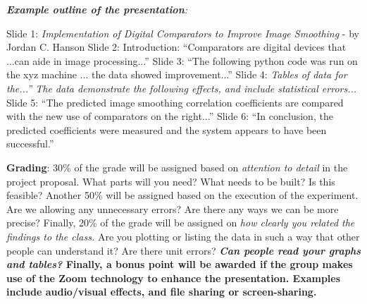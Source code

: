\documentclass[10pt]{article}
\begin{document}
\textit{\textbf{Example outline of the presentation}:}
\begin{outline}[enumerate]
\1 Slide 1: \textit{Implementation of Digital Comparators to Improve Image Smoothing} - by Jordan C. Hanson
\1 Slide 2: Introduction: ``Comparators are digital devices that ...can aide in image processing...''
\1 Slide 3: ``The following python code was run on the xyz machine ... the data showed improvement...''
\1 Slide 4: \textit{Tables of data for the...'' The data demonstrate the following effects, and include statistical errors...}
\1 Slide 5: ``The predicted image smoothing correlation coefficients are compared with the new use of comparators on the right...''
\1 Slide 6: ``In conclusion, the predicted coefficients were measured and the system appears to have been successful.''
\end{outline}
\textbf{Grading}: 30\% of the grade will be assigned based on \textit{attention to detail} in the project proposal.  What parts will you need?  What needs to be built?  Is this feasible?  Another 50\% will be assigned based on the execution of the experiment.  Are we allowing any unnecessary errors?  Are there any ways we can be more precise?  Finally, 20\% of the grade will be assigned on \textit{how clearly you related the findings to the class.}  Are you plotting or listing the data in such a way that other people can understand it?  Are there unit errors?  \textbf{\textit{Can people read your graphs and tables?} Finally, a bonus point will be awarded if the group makes use of the Zoom technology to enhance the presentation.  Examples include audio/visual effects, and file sharing or screen-sharing.}
\end{document}
